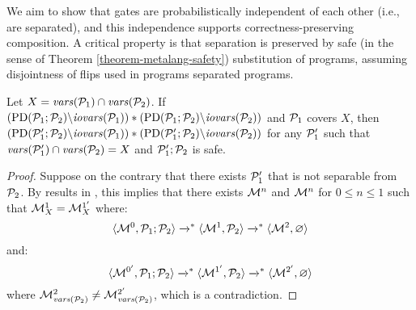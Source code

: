 We aim to show that gates are probabilistically independent of each
other (i.e., are separated), and this independence supports
correctness-preserving composition. A critical property is that
separation is preserved by safe (in the sense of Theorem
\ref{theorem-metalang-safety}) substitution of programs, assuming
disjointness of flips used in programs separated programs.
\begin{lemma}
  \label{lemma-scope}
  Let $X = \mathit{vars}(\mathcal{P}_1) \cap \mathit{vars}(\mathcal{P}_2)$.
  If $(\mathrm{PD}(\mathcal{P}_1;\mathcal{P}_2)\backslash\mathit{iovars}(\mathcal{P}_1)) *
  (\mathrm{PD}(\mathcal{P}_1;\mathcal{P}_2)\backslash\mathit{iovars}(\mathcal{P}_2))$ and $\mathcal{P}_1$
  covers $X$, then 
  $(\mathrm{PD}(\mathcal{P}_1';\mathcal{P}_2)\backslash\mathit{iovars}(\mathcal{P}_1)) *
  (\mathrm{PD}(\mathcal{P}_1';\mathcal{P}_2)\backslash\mathit{iovars}(\mathcal{P}_2))$ for any
  $\mathcal{P}_1'$ such that $\mathit{vars}(\mathcal{P}_1') \cap \mathit{vars}(\mathcal{P}_2) = X$ and
  $\mathcal{P}_1';\mathcal{P}_2$ is safe.
\end{lemma}
\begin{proof}
  Suppose on the contrary that there exists $\mathcal{P}_1'$ that is not
  separable from $\mathcal{P}_2$. By results in
  \cite{barthe2019probabilistic}, this implies that there
  exists $\mathcal{M}^n$ and $\mathcal{M}^n$ for $0 \le n \le 1$ such that
  $\mathcal{M}^1_X = \mathcal{M}^{1'}_X$ where:
  $$
  \langle \mathcal{M}^0,\mathcal{P}_1;\mathcal{P}_2 \rangle \xrightarrow{}^{*} \langle \mathcal{M}^1,\mathcal{P}_2 \rangle \xrightarrow{}^{*}
  \langle \mathcal{M}^2,\varnothing \rangle
  $$
  and:
  $$
  \langle \mathcal{M}^{0'},\mathcal{P}_1;\mathcal{P}_2 \rangle \xrightarrow{}^{*} \langle \mathcal{M}^{1'},\mathcal{P}_2 \rangle \xrightarrow{}^{*}
  \langle \mathcal{M}^{2'},\varnothing \rangle
  $$
  where $\mathcal{M}^2_{\mathit{vars}(\mathcal{P}_2)} \ne \mathcal{M}^{2'}_{\mathit{vars}(\mathcal{P}_2)}$, which is a
  contradiction.
\end{proof}

